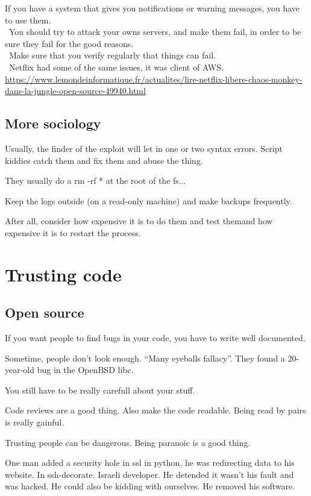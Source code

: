 \documentclass[a4paper,11pt]{article}
\begin{document}
If you  have a system that gives you notifications or warning messages, you have to use them.\\
\
You should try to attack your owns servers, and make them fail, in order to be sure they fail for the good reasons.\\
\
Make sure that you verify regularly that things can fail.\\
\
Netflix had some of the same issues, it was client of AWS.\\
\url{https://www.lemondeinformatique.fr/actualites/lire-netflix-libere-chaos-monkey-dans-la-jungle-open-source-49940.html}

\subsection{More sociology}

Usually, the finder of the exploit will let in one or two syntax errors. Script
kiddies catch them and fix them and abuse the thing.

They usually do a rm -rf * at the root of the fs...

Keep the logs outside (on a read-only machine) and make backups frequently.

After all, consider how expensive it is to do them and test themand how
expensive it is to restart the process.

\section{Trusting code}

\subsection{Open source}
If you want people to find bugs in your code, you have to write well documented.

Sometime, people don't look enough. ``Many eyeballs fallacy''. They found a
20-year-old bug in the OpenBSD libc.

You still have to be really carefull about your stuff.

Code reviews are a good thing. Also make the code readable. Being read by pairs
is really gainful.

Trusting people can be dangerous. Being paranoic is a good thing.

One man added a security hole in ssl in python, he was redirecting data to his
website. In ssh-decorate. Israeli developer. He detended it wasn't his fault and
was hacked. He could also be kidding with ourselves. He removed his software.
\end{document}
